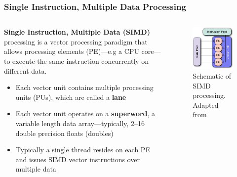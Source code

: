 \documentclass{beamer}
\begin{document}
\begin{frame}
 \frametitle{Single Instruction, Multiple Data Processing}
 \begin{columns}
 
 \begin{column}{0.6\textwidth}
  \textbf{Single Instruction, Multiple Data (SIMD)} processing is a vector processing paradigm that allows processing elements (PE)---e.g a CPU core---to execute the same instruction concurrently on different data.
  \begin{itemize}
    \item Each vector unit contains multiple processing units (PUs), which are called a \textbf{lane}
    \item Each vector unit operates on a \textbf{superword}, a variable length data array---typically, \numrange{2}{16} double precision floats (doubles)
    \item Typically a single thread resides on each PE and issues SIMD vector instructions over multiple data
  \end{itemize}
 \end{column}
 \begin{column}{0.4\textwidth}
  \begin{figure}
    \centering
    \includegraphics[width=\columnwidth]{SIMD.pdf}
    \caption{Schematic of SIMD processing.  Adapted from\footnotemark}
  \end{figure}
 \end{column}
 \end{columns}
\end{frame}
\end{document}
